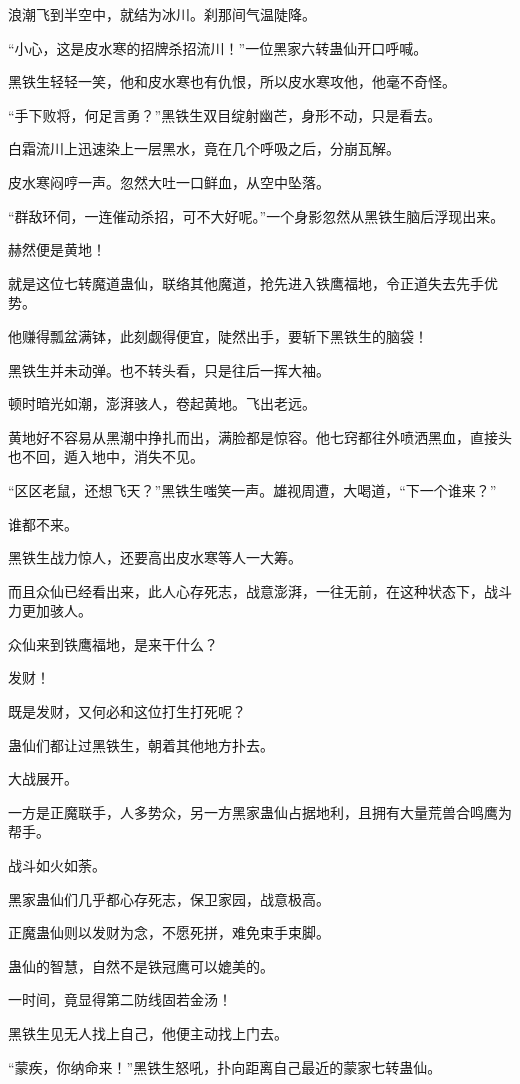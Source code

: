 \begin{this_body}
浪潮飞到半空中，就结为冰川。刹那间气温陡降。

“小心，这是皮水寒的招牌杀招流川！”一位黑家六转蛊仙开口呼喊。

黑铁生轻轻一笑，他和皮水寒也有仇恨，所以皮水寒攻他，他毫不奇怪。

“手下败将，何足言勇？”黑铁生双目绽射幽芒，身形不动，只是看去。

白霜流川上迅速染上一层黑水，竟在几个呼吸之后，分崩瓦解。

皮水寒闷哼一声。忽然大吐一口鲜血，从空中坠落。

“群敌环伺，一连催动杀招，可不大好呢。”一个身影忽然从黑铁生脑后浮现出来。

赫然便是黄地！

就是这位七转魔道蛊仙，联络其他魔道，抢先进入铁鹰福地，令正道失去先手优势。

他赚得瓢盆满钵，此刻觑得便宜，陡然出手，要斩下黑铁生的脑袋！

黑铁生并未动弹。也不转头看，只是往后一挥大袖。

顿时暗光如潮，澎湃骇人，卷起黄地。飞出老远。

黄地好不容易从黑潮中挣扎而出，满脸都是惊容。他七窍都往外喷洒黑血，直接头也不回，遁入地中，消失不见。

“区区老鼠，还想飞天？”黑铁生嗤笑一声。雄视周遭，大喝道，“下一个谁来？”

谁都不来。

黑铁生战力惊人，还要高出皮水寒等人一大筹。

而且众仙已经看出来，此人心存死志，战意澎湃，一往无前，在这种状态下，战斗力更加骇人。

众仙来到铁鹰福地，是来干什么？

发财！

既是发财，又何必和这位打生打死呢？

蛊仙们都让过黑铁生，朝着其他地方扑去。

大战展开。

一方是正魔联手，人多势众，另一方黑家蛊仙占据地利，且拥有大量荒兽合鸣鹰为帮手。

战斗如火如荼。

黑家蛊仙们几乎都心存死志，保卫家园，战意极高。

正魔蛊仙则以发财为念，不愿死拼，难免束手束脚。

蛊仙的智慧，自然不是铁冠鹰可以媲美的。

一时间，竟显得第二防线固若金汤！

黑铁生见无人找上自己，他便主动找上门去。

“蒙疾，你纳命来！”黑铁生怒吼，扑向距离自己最近的蒙家七转蛊仙。


\end{this_body}
